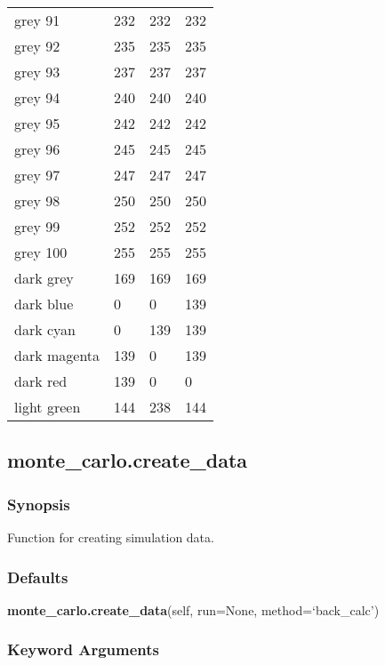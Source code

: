 \begin{center}
\begin{tabular}{llll}
  grey 91 & 232 & 232 & 232  \\
  grey 92 & 235 & 235 & 235  \\
  grey 93 & 237 & 237 & 237  \\
  grey 94 & 240 & 240 & 240  \\
  grey 95 & 242 & 242 & 242  \\
  grey 96 & 245 & 245 & 245  \\
  grey 97 & 247 & 247 & 247  \\
  grey 98 & 250 & 250 & 250  \\
  grey 99 & 252 & 252 & 252  \\
  grey 100 & 255 & 255 & 255  \\
  dark grey & 169 & 169 & 169  \\
  dark blue & 0 & 0 & 139  \\
  dark cyan & 0 & 139 & 139  \\
  dark magenta & 139 & 0 & 139  \\
  dark red & 139 & 0 & 0  \\
  light green & 144 & 238 & 144  \\
 \bottomrule 
 \end{tabular} 
 \end{center} 
  

  

 \newpage 

 \subsection{monte\_carlo.create\_data} 

  
 \subsubsection{Synopsis} 

 Function for creating simulation data. 
  

  
 \subsubsection{Defaults} 

 \textsf{\textbf{monte\_carlo.create\_data}(self, run=None, method=`back\_calc')} 

  
 \subsubsection{Keyword Arguments} 

